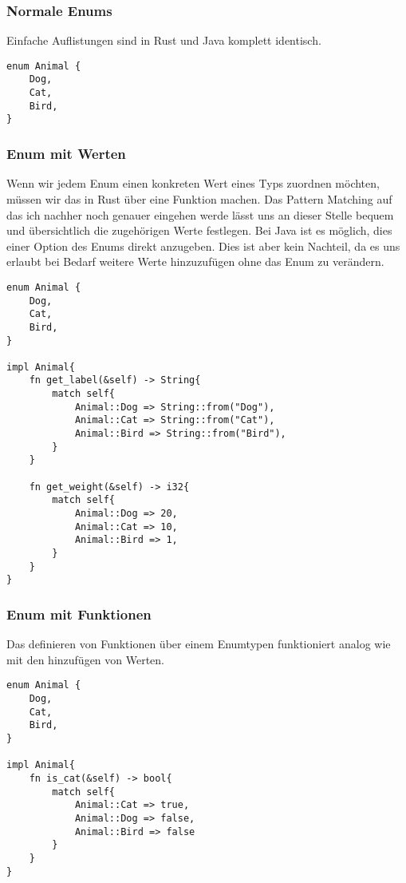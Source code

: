 \documentclass[a4paper, 1ppt]{article}
\begin{document}
\subsubsection{Normale Enums}
Einfache Auflistungen sind in Rust und Java komplett identisch.
\begin{verbatim}
enum Animal {
    Dog,
    Cat,
    Bird,
}
\end{verbatim}
\subsubsection{Enum mit Werten}
Wenn wir jedem Enum einen konkreten Wert eines Typs zuordnen möchten, müssen wir das in Rust über eine Funktion machen.
Das Pattern Matching auf das ich nachher noch genauer eingehen werde lässt uns an dieser Stelle bequem und übersichtlich die zugehörigen Werte festlegen.
Bei Java ist es möglich, dies einer Option des Enums direkt anzugeben. Dies ist aber kein Nachteil, da es uns erlaubt bei Bedarf weitere Werte hinzuzufügen ohne das Enum zu verändern.
\begin{verbatim}
enum Animal {
    Dog,
    Cat,
    Bird,
}

impl Animal{
    fn get_label(&self) -> String{
        match self{
            Animal::Dog => String::from("Dog"),
            Animal::Cat => String::from("Cat"),
            Animal::Bird => String::from("Bird"),
        }
    }

    fn get_weight(&self) -> i32{
        match self{
            Animal::Dog => 20,
            Animal::Cat => 10,
            Animal::Bird => 1,
        }
    }
}

\end{verbatim}
\subsubsection{Enum mit Funktionen}
Das definieren von Funktionen über einem Enumtypen funktioniert analog wie mit den hinzufügen von Werten.
\begin{verbatim}
enum Animal {
    Dog,
    Cat,
    Bird,
}

impl Animal{
    fn is_cat(&self) -> bool{
        match self{
            Animal::Cat => true,
            Animal::Dog => false,
            Animal::Bird => false
        }
    }
}
\end{verbatim}
\end{document}
